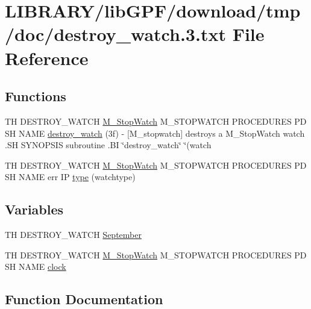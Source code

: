 \hypertarget{destroy__watch_83_8txt}{}\section{L\+I\+B\+R\+A\+R\+Y/lib\+G\+P\+F/download/tmp/doc/destroy\+\_\+watch.3.txt File Reference}
\label{destroy__watch_83_8txt}
\subsection*{Functions}
\begin{DoxyCompactItemize}
\item 
TH D\+E\+S\+T\+R\+O\+Y\+\_\+\+W\+A\+T\+CH \hyperlink{option__stopwatch_83_8txt_aa2011fc45a5e502e87ee50996a8a9305}{M\+\_\+\+Stop\+Watch} M\+\_\+\+S\+T\+O\+P\+W\+A\+T\+CH P\+R\+O\+C\+E\+D\+U\+R\+ES PD SH N\+A\+ME \hyperlink{destroy__watch_83_8txt_aeb23b46d3b50996f7af1c0c77c7fe713}{destroy\+\_\+watch} (3f) -\/ \mbox{[}\+M\+\_\+stopwatch\mbox{]} destroys a M\+\_\+\+Stop\+Watch watch .\+S\+H S\+Y\+N\+O\+P\+S\+I\+S subroutine .\+B\+I \char`\"{}destroy\+\_\+watch\char`\"{} \char`\"{}(watch
\item 
TH D\+E\+S\+T\+R\+O\+Y\+\_\+\+W\+A\+T\+CH \hyperlink{option__stopwatch_83_8txt_aa2011fc45a5e502e87ee50996a8a9305}{M\+\_\+\+Stop\+Watch} M\+\_\+\+S\+T\+O\+P\+W\+A\+T\+CH P\+R\+O\+C\+E\+D\+U\+R\+ES PD SH N\+A\+ME err IP \hyperlink{destroy__watch_83_8txt_a7bc32e4b0bf5a4206ac0c208a77e9d4b}{type} (watchtype)
\end{DoxyCompactItemize}
\subsection*{Variables}
\begin{DoxyCompactItemize}
\item 
TH D\+E\+S\+T\+R\+O\+Y\+\_\+\+W\+A\+T\+CH \hyperlink{destroy__watch_83_8txt_acabdf4ce798cad6afe1d3f1796bf4814}{September}
\item 
TH D\+E\+S\+T\+R\+O\+Y\+\_\+\+W\+A\+T\+CH \hyperlink{option__stopwatch_83_8txt_aa2011fc45a5e502e87ee50996a8a9305}{M\+\_\+\+Stop\+Watch} M\+\_\+\+S\+T\+O\+P\+W\+A\+T\+CH P\+R\+O\+C\+E\+D\+U\+R\+ES PD SH N\+A\+ME \hyperlink{destroy__watch_83_8txt_ac1453e74487611128ccb9ee120e5c70d}{clock}
\end{DoxyCompactItemize}


\subsection{Function Documentation}
\mbox{\label{destroy__watch_83_8txt_aeb23b46d3b50996f7af1c0c77c7fe713}} 
